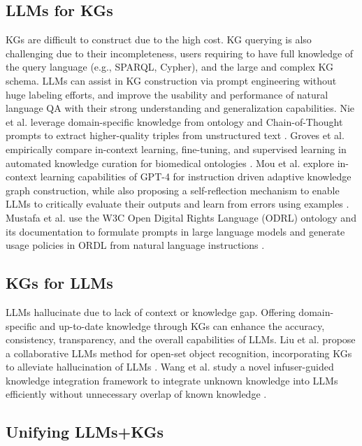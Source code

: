 \documentclass{sig-alternate-10pt}
\begin{document}
\subsection{LLMs for KGs}
\label{sec:category1}

\medskip
\medskip

KGs are difficult to construct due to the high cost. KG querying is also challenging due to their incompleteness, users requiring to have full knowledge of the query language (e.g., SPARQL, Cypher), and the large and complex KG schema. 
LLMs can assist in KG construction via prompt engineering without huge labeling efforts, and improve the usability and performance of natural language QA with their strong understanding and generalization capabilities. Nie et al. leverage domain-specific knowledge from ontology and Chain-of-Thought prompts to extract higher-quality triples from unstructured text \cite{NHSWZJZS24}. Groves et al. empirically compare in-context learning, fine-tuning, and supervised learning in automated knowledge curation for biomedical ontologies \cite{GWAKHWW24}. Mou et al. explore in-context learning capabilities of GPT-4 for instruction driven adaptive knowledge graph construction, while also proposing a self-reflection mechanism to enable LLMs to critically evaluate their outputs and learn from errors using examples \cite{MLSCD24}. Mustafa et al. use the W3C Open Digital Rights Language (ODRL) ontology and its documentation
to formulate prompts in
large language models and generate usage policies in ORDL from natural language instructions \cite{MNCAQLD24}.

\subsection{KGs for LLMs}
\label{sec:category2}

\medskip
\medskip

LLMs hallucinate due to lack of context or knowledge gap. Offering domain-specific and up-to-date knowledge through KGs can enhance the accuracy, consistency, transparency, and the overall capabilities of LLMs.
Liu et al. propose a collaborative LLMs method for open-set object recognition, incorporating
KGs to alleviate hallucination of LLMs
\cite{LWZCWLW24}. Wang et al.
study a novel infuser-guided knowledge
integration framework to integrate unknown knowledge into LLMs efficiently without unnecessary overlap of known knowledge
\cite{WBWYLCC24}.

\subsection{Unifying LLMs+KGs}
\label{sec:category3}
\end{document}
